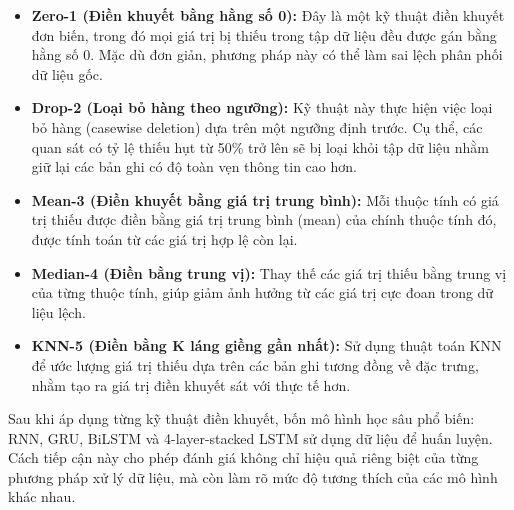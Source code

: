 \begin{itemize}
    \item \textbf{Zero-1 (Điền khuyết bằng hằng số 0):} Đây là một kỹ thuật điền khuyết đơn biến, trong đó mọi giá trị bị thiếu trong tập dữ liệu đều được gán bằng hằng số 0. Mặc dù đơn giản, phương pháp này có thể làm sai lệch phân phối dữ liệu gốc.

    \item \textbf{Drop-2 (Loại bỏ hàng theo ngưỡng):} Kỹ thuật này thực hiện việc loại bỏ hàng (casewise deletion) dựa trên một ngưỡng định trước. Cụ thể, các quan sát có tỷ lệ thiếu hụt từ 50\% trở lên sẽ bị loại khỏi tập dữ liệu nhằm giữ lại các bản ghi có độ toàn vẹn thông tin cao hơn.

    \item \textbf{Mean-3 (Điền khuyết bằng giá trị trung bình):} Mỗi thuộc tính có giá trị thiếu được điền bằng giá trị trung bình (mean) của chính thuộc tính đó, được tính toán từ các giá trị hợp lệ còn lại.

    \item \textbf{Median-4 (Điền bằng trung vị):} Thay thế các giá trị thiếu bằng trung vị của từng thuộc tính, giúp giảm ảnh hưởng từ các giá trị cực đoan trong dữ liệu lệch.

    \item \textbf{KNN-5 (Điền bằng K láng giềng gần nhất):} Sử dụng thuật toán KNN để ước lượng giá trị thiếu dựa trên các bản ghi tương đồng về đặc trưng, nhằm tạo ra giá trị điền khuyết sát với thực tế hơn.
\end{itemize}

Sau khi áp dụng từng kỹ thuật điền khuyết, bốn mô hình học sâu phổ biến: RNN, GRU, BiLSTM và 4-layer-stacked LSTM sử dụng dữ liệu để huấn luyện. Cách tiếp cận này cho phép đánh giá không chỉ hiệu quả riêng biệt của từng phương pháp xử lý dữ liệu, mà còn làm rõ mức độ tương thích của các mô hình khác nhau.



